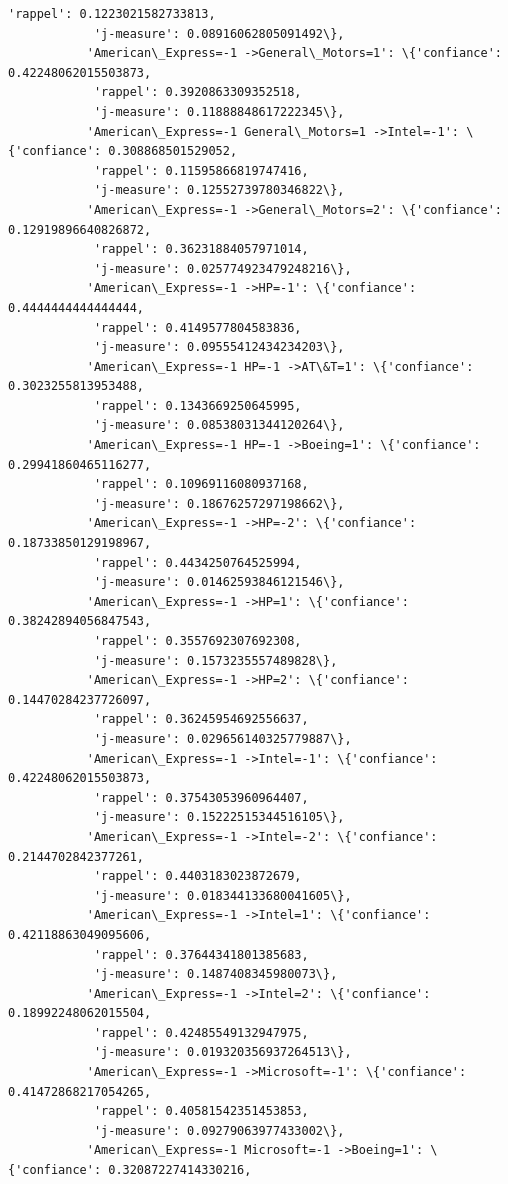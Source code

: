 \documentclass[11pt]{article}
\begin{document}
\begin{Verbatim}[commandchars=\\\{\}]
            'rappel': 0.1223021582733813,
            'j-measure': 0.08916062805091492\},
           'American\_Express=-1 ->General\_Motors=1': \{'confiance': 0.42248062015503873,
            'rappel': 0.3920863309352518,
            'j-measure': 0.11888848617222345\},
           'American\_Express=-1 General\_Motors=1 ->Intel=-1': \{'confiance': 0.308868501529052,
            'rappel': 0.11595866819747416,
            'j-measure': 0.12552739780346822\},
           'American\_Express=-1 ->General\_Motors=2': \{'confiance': 0.12919896640826872,
            'rappel': 0.36231884057971014,
            'j-measure': 0.025774923479248216\},
           'American\_Express=-1 ->HP=-1': \{'confiance': 0.4444444444444444,
            'rappel': 0.4149577804583836,
            'j-measure': 0.09555412434234203\},
           'American\_Express=-1 HP=-1 ->AT\&T=1': \{'confiance': 0.3023255813953488,
            'rappel': 0.1343669250645995,
            'j-measure': 0.08538031344120264\},
           'American\_Express=-1 HP=-1 ->Boeing=1': \{'confiance': 0.29941860465116277,
            'rappel': 0.10969116080937168,
            'j-measure': 0.18676257297198662\},
           'American\_Express=-1 ->HP=-2': \{'confiance': 0.18733850129198967,
            'rappel': 0.4434250764525994,
            'j-measure': 0.01462593846121546\},
           'American\_Express=-1 ->HP=1': \{'confiance': 0.38242894056847543,
            'rappel': 0.3557692307692308,
            'j-measure': 0.1573235557489828\},
           'American\_Express=-1 ->HP=2': \{'confiance': 0.14470284237726097,
            'rappel': 0.36245954692556637,
            'j-measure': 0.029656140325779887\},
           'American\_Express=-1 ->Intel=-1': \{'confiance': 0.42248062015503873,
            'rappel': 0.37543053960964407,
            'j-measure': 0.15222515344516105\},
           'American\_Express=-1 ->Intel=-2': \{'confiance': 0.2144702842377261,
            'rappel': 0.4403183023872679,
            'j-measure': 0.018344133680041605\},
           'American\_Express=-1 ->Intel=1': \{'confiance': 0.42118863049095606,
            'rappel': 0.37644341801385683,
            'j-measure': 0.1487408345980073\},
           'American\_Express=-1 ->Intel=2': \{'confiance': 0.18992248062015504,
            'rappel': 0.42485549132947975,
            'j-measure': 0.019320356937264513\},
           'American\_Express=-1 ->Microsoft=-1': \{'confiance': 0.41472868217054265,
            'rappel': 0.40581542351453853,
            'j-measure': 0.09279063977433002\},
           'American\_Express=-1 Microsoft=-1 ->Boeing=1': \{'confiance': 0.32087227414330216,

\end{Verbatim}
\end{document}
